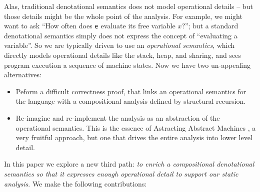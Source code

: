 Alas, traditional denotational semantics does not
model operational details -- but those details might be the whole point of the analysis.  For example,
we might want to ask ``How often does $\mathsf{e}$ evaluate its free variable $x$?'';
but a standard denotational semantics simply does not express the concept of ``evaluating a variable''.
So we are typically driven to use an \emph{operational semantics}, which directly
models operational details like the stack, heap, and sharing, and sees program execution
a sequence of machine states.  Now we have two un-appealing alternatives:
\begin{itemize}
\item Peform a difficult correctness proof, that links an operational semantics for the language
  with a compositional analysis defined by structural recursion.
\item Re-imagine and re-implement the analysis as an abstraction of the operational semantics.
  This is the essence of Astracting Abstract Machines \cite{aam}, a very fruitful approach, but one
  that drives the entire analysis into lower level detail. 
\end{itemize}
In this paper we explore a new third path: \emph{to enrich a compositional denotational semantics so that
it expresses enough operational detail to support our static analysis}.
We make the following contributions:
